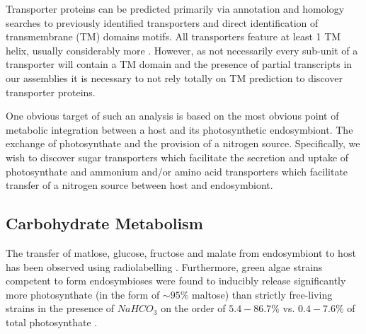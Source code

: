 

Transporter proteins can be predicted  
primarily via annotation and homology searches to previously
identified transporters \citep{Saier2006,Saier2009,Saier2014} 
and direct identification of transmembrane (TM) domains motifs. 
All transporters feature at least 1 TM helix, usually considerably
more \citep{VonHeijne2006}.  However, as not necessarily every sub-unit of
a transporter will contain a TM domain and the presence of partial transcripts
in our assemblies it is necessary to not rely totally on TM prediction to discover
transporter proteins.

One obvious target of such an analysis is based on the most obvious point
of metabolic integration between a host and its photosynthetic endosymbiont.
The exchange of photosynthate and the provision of a nitrogen source.
Specifically, we wish to discover sugar transporters which facilitate the
secretion and uptake of photosynthate and ammonium and/or amino acid transporters
which facilitate transfer of a nitrogen source between host and endosymbiont.

\subsection{Carbohydrate Metabolism}


The transfer of matlose, glucose, fructose and malate from endosymbiont
to host has been observed using radiolabelling 
\citep{Brown1974}.  Furthermore, green algae strains competent to
form endosymbioses were found to inducibly release significantly
more photosynthate (in the form of \(\sim 95\%\) maltose) than strictly free-living strains
in the presence of \(NaHCO_3\) on the order of \(5.4-86.7\%\) vs. \(0.4-7.6\%\)
of total photosynthate \citep{Muscatine1967a}.

